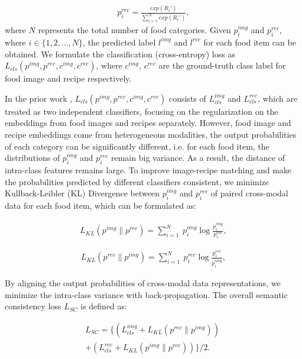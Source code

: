 \documentclass[journal]{IEEEtran}
\begin{document}
\begin{equation}
\begin{aligned}
p_{i}^{rec} = \frac{exp(R_{i}')}{\sum_{i=1}^{N} exp(R_{i}')}, 
\end{aligned}
\end{equation}
where $N$ represents the total number of food categories. Given $p_{i}^{img}$ and $p_{i}^{rec}$, where $i \in \{1, 2, ..., N\}$, the predicted label $l^{img}$ and $l^{rec}$ for each food item can be obtained. We formulate the classification (cross-entropy) loss as $L_{cls}(p^{img}, p^{rec}, c^{img}, c^{rec})$, where $c^{img}$, $c^{rec}$ are the ground-truth class label for food image and recipe respectively.

In the prior work \cite{salvador2017learning}, $L_{cls}(p^{img}, p^{rec}, c^{img}, c^{rec})$ consists of $L^{img}_{cls}$ and $L^{rec}_{cls}$, which are treated as two independent classifiers, focusing on the regularization on the embeddings from food images and recipes separately. However, food image and recipe embeddings come from heterogeneous modalities, the output probabilities of each category can be significantly different, i.e. for each food item, the distributions of $p_{i}^{img}$ and $p_{i}^{rec}$ remain big variance. As a result, the distance of intra-class features remains large. To improve image-recipe matching and make the probabilities predicted by different classifiers consistent, we minimize Kullback-Leibler (KL) Divergence between $p_{i}^{img}$ and $p_{i}^{rec}$ of paired cross-modal data for each food item, which can be formulated as:

\begin{equation}
\begin{aligned}
 L_{KL}({p}^{img}\|{p}^{rec}) = \sum_{i=1}^{N} \ p_i^{img} \log \frac{p_i^{img}}{p_i^{rec}},
\end{aligned}
\end{equation}

\begin{equation}
\begin{aligned}
 L_{KL}({p}^{rec}\|{p}^{img}) = \sum_{i=1}^{N} \ p_i^{rec} \log \frac{p_i^{rec}}{p_i^{img}},
\end{aligned}
\end{equation}

By aligning the output probabilities of cross-modal data representations, we minimize the intra-class variance with back-propagation. The overall semantic consistency loss $L_{SC}$ is defined as:

\begin{equation}
\begin{aligned}
 L_{SC} = \{( L^{img}_{cls} + L_{KL}({p}^{rec}\|{p}^{img})) \; \\
 + ( L^{rec}_{cls}+ L_{KL}({p}^{img}\|{p}^{rec}))\} / 2.
\end{aligned}
\end{equation}
\end{document}
